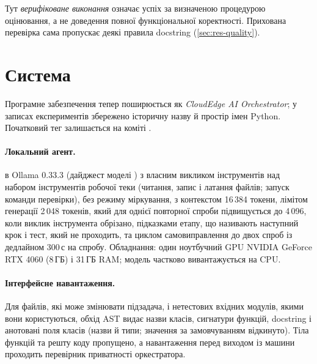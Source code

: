 \documentclass[11pt]{article}
\begin{document}
Тут \emph{верифіковане виконання} означає успіх за визначеною процедурою оцінювання, а не доведення повної функціональної коректності. Прихована перевірка сама пропускає деякі правила docstring (\cref{sec:res-quality}).

\section{Система}\label{sec:system}
Програмне забезпечення тепер поширюється як \emph{CloudEdge AI Orchestrator}; у записах експериментів збережено історичну назву й простір імен Python. Початковий тег  залишається на коміті .
\paragraph{Локальний агент.}  в Ollama 0.33.3 (дайджест моделі ) з власним викликом інструментів над набором інструментів робочої теки (читання, запис і латання файлів; запуск команди перевірки), без режиму міркування, з контекстом 16\,384 токени, лімітом генерації 2\,048 токенів, який для однієї повторної спроби підвищується до 4\,096, коли виклик інструмента обрізано, підказками етапу, що називають наступний крок і тест, який не проходить, та циклом самовиправлення до двох спроб із дедлайном 300\,с на спробу. Обладнання: один ноутбучний GPU NVIDIA GeForce RTX 4060 (8\,ГБ) і 31\,ГБ RAM; модель частково вивантажується на CPU.

\paragraph{Інтерфейсне навантаження.} Для файлів, які може змінювати підзадача, і нетестових вхідних модулів, якими вони користуються, обхід AST видає назви класів, сигнатури функцій, docstring і анотовані поля класів (назви й типи; значення за замовчуванням відкинуто). Тіла функцій та решту коду пропущено, а навантаження перед виходом із машини проходить перевірник приватності оркестратора.
\end{document}

